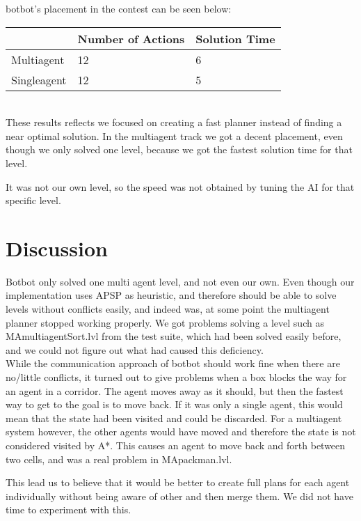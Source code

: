 \documentclass[letterpaper]{article}
\begin{document}
botbot's placement in the contest can be seen below:\\

\begin{tabular}{l|l|l}
 & Number of Actions & Solution Time \\
\hline
Multiagent & 12 & 6 \\
Singleagent & 12 & 5 \\
\end{tabular}\\

These results reflects we focused on creating a fast planner instead of finding
a near optimal solution. In the multiagent track we got a decent placement, even
though we only solved one level, because we got the fastest solution time for that level.

It was not our own level, so the speed was not obtained by tuning the AI for that
specific level.

\section{Discussion}
Botbot only solved one multi agent level, and not even our own. Even though our
implementation uses APSP as heuristic, and therefore should be able to solve
levels without conflicts easily, and indeed was, at some point the multiagent
planner stopped working properly. We got problems solving a level such as MAmultiagentSort.lvl
from the test suite, which had been solved easily before, and we could not
figure out what had caused this deficiency.\\

While the communication approach of botbot should work fine when there are
no/little conflicts, it turned out to give problems when a box blocks the way for
an agent in a corridor. The agent moves away as it should, but then the fastest
way to get to the goal is to move back. If it was only a single agent, this would
mean that the state had been visited and could be discarded. For a multiagent system
however, the other agents would have moved and therefore the state is not considered
visited by A*. This causes an agent to move back and forth between two cells, and
was a real problem in MApackman.lvl.

This lead us to believe that it would be better to create full plans for each agent
individually without being aware of other and then merge them. We did not have time
to experiment with this.\\
\end{document}
